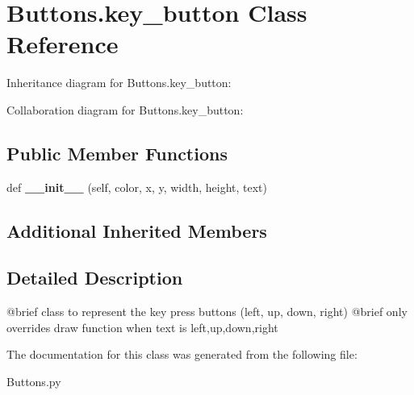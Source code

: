 \hypertarget{class_buttons_1_1key__button}{}\section{Buttons.\+key\+\_\+button Class Reference}
\label{class_buttons_1_1key__button}


Inheritance diagram for Buttons.\+key\+\_\+button\+:


Collaboration diagram for Buttons.\+key\+\_\+button\+:
\subsection*{Public Member Functions}
\begin{DoxyCompactItemize}
\item 
\mbox{\label{class_buttons_1_1key__button_a0528a87f1cff92319f150cadf1c32d72}} 
def {\bfseries \+\_\+\+\_\+init\+\_\+\+\_\+} (self, color, x, y, width, height, text)
\end{DoxyCompactItemize}
\subsection*{Additional Inherited Members}


\subsection{Detailed Description}
\begin{DoxyVerb}@brief class to represent the key press buttons (left, up, down, right)
@brief only overrides draw function when text is left,up,down,right
\end{DoxyVerb}
 

The documentation for this class was generated from the following file\+:\begin{DoxyCompactItemize}
\item 
Buttons.\+py\end{DoxyCompactItemize}
